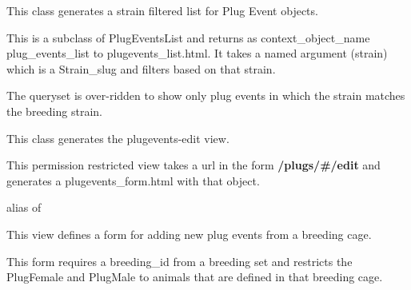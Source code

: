 \documentclass[letterpaper,10pt,english]{sphinxmanual}
\begin{document}
\begin{fulllineitems}
\label{timed_mating:mousedb.timed_mating.views.PlugEventsListStrain}
This class generates a strain filtered list for Plug Event objects.

This is a subclass of PlugEventsList and returns as context\_object\_name plug\_events\_list to plugevents\_list.html.
It takes a named argument (strain) which is a Strain\_slug and filters based on that strain.

\begin{fulllineitems}
\label{timed_mating:mousedb.timed_mating.views.PlugEventsListStrain.get_queryset}
The queryset is over-ridden to show only plug events in which the strain matches the breeding strain.

\end{fulllineitems}


\end{fulllineitems}


\begin{fulllineitems}
\label{timed_mating:mousedb.timed_mating.views.PlugEventsUpdate}
This class generates the plugevents-edit view.

This permission restricted view takes a url in the form \textbf{/plugs/\#/edit} and generates a plugevents\_form.html with that object.

\begin{fulllineitems}
\label{timed_mating:mousedb.timed_mating.views.PlugEventsUpdate.model}
alias of 

\end{fulllineitems}


\end{fulllineitems}


\begin{fulllineitems}
\label{timed_mating:mousedb.timed_mating.views.breeding_plugevent}
This view defines a form for adding new plug events from a breeding cage.

This form requires a breeding\_id from a breeding set and restricts the PlugFemale and PlugMale to animals that are defined in that breeding cage.

\end{fulllineitems}
\end{document}
